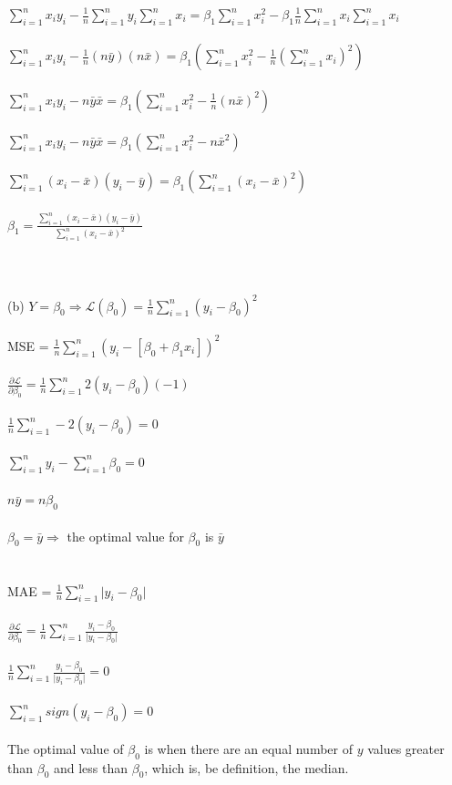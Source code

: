 \documentclass[12pt, letterpaper]{report}
\newcommand\tab[1][1cm]{\hspace*{#1}}
\begin{document}
\tab$\sum_{i=1}^{n} x_iy_i - \frac{1}{n}\sum_{i=1}^{n}y_i\sum_{i=1}^{n}x_i = \beta_1 \sum_{i=1}^{n}x^2_i - \beta_1\frac{1}{n}\sum_{i=1}^{n}x_i\sum_{i=1}^{n}x_i $\\\\
\tab$\sum_{i=1}^{n} x_iy_i - \frac{1}{n}(n\bar{y})(n\bar{x}) = \beta_1 (\sum_{i=1}^{n}x^2_i - \frac{1}{n}(\sum_{i=1}^{n}x_i)^2)$\\\\
\tab$\sum_{i=1}^{n} x_iy_i - n\bar{y}\bar{x} = \beta_1 (\sum_{i=1}^{n}x^2_i - \frac{1}{n}(n\bar{x})^2)$\\\\
\tab$\sum_{i=1}^{n} x_iy_i - n\bar{y}\bar{x} = \beta_1 (\sum_{i=1}^{n}x^2_i - n\bar{x}^2)$\\\\
\tab$\sum_{i=1}^{n} (x_i-\bar{x})(y_i-\bar{y}) = \beta_1 (\sum_{i=1}^{n}(x_i - \bar{x})^2)$\\\\
\tab$\beta_1 = \frac{\sum_{i=1}^{n} (x_i-\bar{x})(y_i-\bar{y})}{\sum_{i=1}^{n}(x_i - \bar{x})^2}$\\\\
\\\\
\indent (b) $Y = \beta_0 \Rightarrow \mathcal{L}(\beta_0) = \frac{1}{n}\sum_{i=1}^{n}(y_i - \beta_0)^2$\\\\
\tab MSE = $\frac{1}{n}\sum_{i=1}^{n}(y_i - [\beta_0 + \beta_1x_i])^2$\\\\
\tab$\frac{\partial\mathcal{L}}{\partial\beta_0} = \frac{1}{n}\sum_{i=1}^{n}2(y_i - \beta_0)(-1)$\\\\
\tab$\frac{1}{n}\sum_{i=1}^{n}-2(y_i - \beta_0) = 0$\\\\
\tab$\sum_{i=1}^{n}y_i - \sum_{i=1}^{n}\beta_0 = 0$\\\\
\tab$n\bar{y} = n\beta_0$\\\\
\tab $\beta_0 = \bar{y} \Rightarrow $ the optimal value for $\beta_0$ is $\bar{y}$\\\\
\\
\tab MAE = $\frac{1}{n}\sum_{i=1}^{n} \lvert y_i - \beta_0 \rvert$\\\\
\tab$\frac{\partial\mathcal{L}}{\partial\beta_0} = \frac{1}{n}\sum_{i=1}^{n}\frac{y_i-\beta_0}{\lvert y_i-\beta_0\rvert}$\\\\
\tab$\frac{1}{n}\sum_{i=1}^{n}\frac{y_i-\beta_0}{\lvert y_i-\beta_0\rvert} = 0$\\\\
\tab$\sum_{i=1}^{n}sign(y_i-\beta_0) = 0$\\\\
The optimal value of $\beta_0$ is when there are an equal number of $y$ values greater than $\beta_0$ and less than $\beta_0$, which is, be definition, the median.
\end{document}
